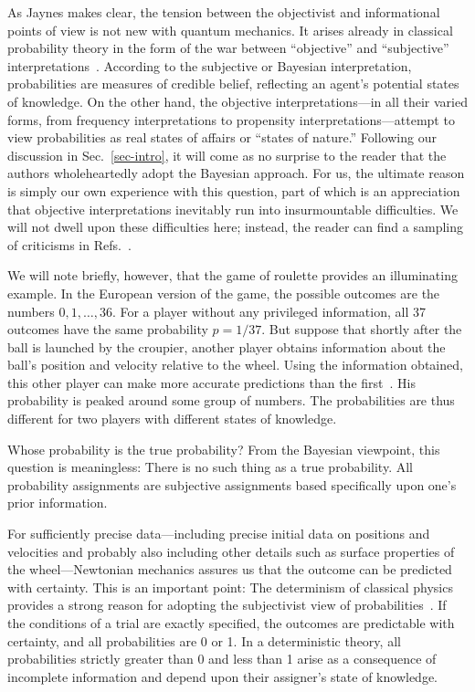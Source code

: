 \documentclass[12pt,aps,eqsecnum]{revtex4-1}
\begin{document}
As Jaynes makes clear, the tension between the objectivist and
informational points of view is not new with quantum mechanics.
It arises already in classical probability theory in the form of
the war between ``objective'' and ``subjective''
interpretations~\cite{Daston1994}. According to the subjective or
Bayesian interpretation, probabilities are measures of credible
belief, reflecting an agent's potential states of knowledge. On
the other hand, the objective interpretations---in all their
varied forms, from frequency interpretations to propensity
interpretations---attempt to view probabilities as real states of
affairs or ``states of nature.'' Following our discussion in
Sec.~\ref{sec-intro}, it will come as no surprise to the reader
that the authors wholeheartedly adopt the Bayesian approach. For
us, the ultimate reason is simply our own experience with this
question, part of which is an appreciation that objective
interpretations inevitably run into insurmountable difficulties.
We will not dwell upon these difficulties here; instead, the
reader can find a sampling of criticisms in
Refs.~\cite{Jaynes1983,Kyburg1980,JaynesPosthumous,Bernardo1994,%
Savage1972}.

We will note briefly, however, that the game of roulette provides
an illuminating example. In the European version of the game, the
possible outcomes are the numbers $0,1,\ldots,36$.  For a player
without any privileged information, all 37 outcomes have the same
probability $p=1/37$.  But suppose that shortly after the ball is
launched by the croupier, another player obtains information about
the ball's position and velocity relative to the wheel. Using the
information obtained, this other player can make more accurate
predictions than the first~\cite{NewtonianCasino}. His probability
is peaked around some group of numbers. The probabilities are
thus different for two players with different states of knowledge.

Whose probability is the true probability? From the Bayesian
viewpoint, this question is meaningless:  There is no such thing
as a true probability.  All probability assignments are subjective
assignments based specifically upon one's prior information.

For sufficiently precise data---including precise initial data on
positions and velocities and probably also including other details
such as surface properties of the wheel---Newtonian mechanics
assures us that the outcome can be predicted with certainty.  This
is an important point: The determinism of classical physics
provides a strong reason for adopting the subjectivist view of
probabilities~\cite{Giere1973}.  If the conditions of a trial are
exactly specified, the outcomes are predictable with certainty,
and all probabilities are 0 or 1. In a deterministic theory, all
probabilities strictly greater than 0 and less than 1 arise as a
consequence of incomplete information and depend upon their
assigner's state of knowledge.
\end{document}
